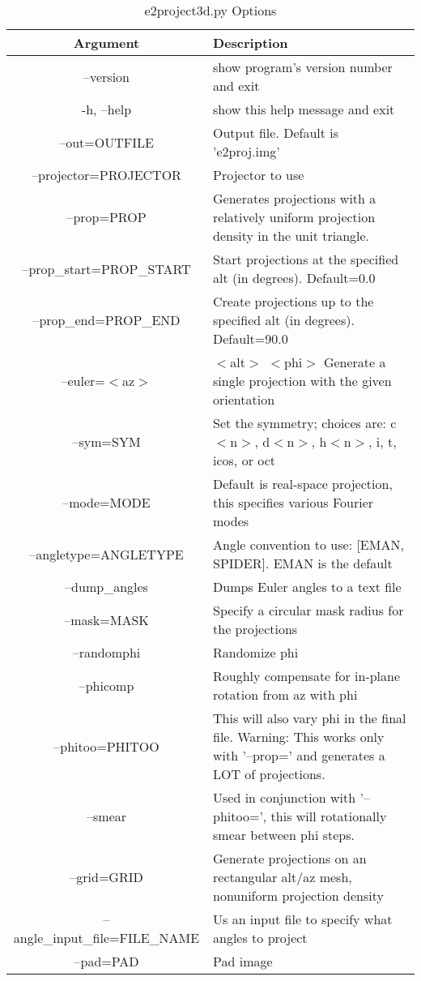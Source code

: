 \begin{longtable}{|c||p{3.5in}|}
\hline \bf{Argument} & \bf{Description}\endhead
\hline \multicolumn{2}{r}{{Continued on next page}} \endfoot
\hline \hline \caption[e2project3d.py Options]{e2project3d.py Options}\endlastfoot
\\\hline   --version  &  show program's version number and exit
\\\hline   -h, --help  &  show this help message and exit
\\\hline   --out=OUTFILE  &  Output file. Default is 'e2proj.img'
\\\hline   --projector=PROJECTOR  &  Projector to use
\\\hline   --prop=PROP  &  Generates projections with a relatively uniform projection density in the unit triangle.
\\\hline   --prop\_start=PROP\_START  &  Start projections at the specified alt (in degrees). Default=0.0
\\\hline   --prop\_end=PROP\_END  &  Create projections up to the specified alt (in degrees). Default=90.0
\\\hline   --euler=$<$az$>$  &  $<$alt$>$ $<$phi$>$ Generate a single projection with the given orientation
\\\hline   --sym=SYM  &  Set the symmetry; choices are: c$<$n$>$, d$<$n$>$, h$<$n$>$, i, t, icos, or oct
\\\hline   --mode=MODE  &  Default is real-space projection, this specifies various Fourier modes
\\\hline   --angletype=ANGLETYPE  &  Angle convention to use: [EMAN, SPIDER].  EMAN is the default
\\\hline   --dump\_angles  &  Dumps Euler angles to a text file
\\\hline   --mask=MASK  &  Specify a circular mask radius for the projections
\\\hline   --randomphi  &  Randomize phi
\\\hline   --phicomp  &  Roughly compensate for in-plane rotation from az with phi
\\\hline   --phitoo=PHITOO  &  This will also vary phi in the final file. Warning: This works only with '--prop=' and generates a LOT of projections.
\\\hline   --smear  &  Used in conjunction with '--phitoo=', this will rotationally smear between phi steps.
\\\hline   --grid=GRID  &  Generate projections on an rectangular alt/az mesh, nonuniform projection density
\\\hline   --angle\_input\_file=FILE\_NAME  &  Us an input file to specify what angles to project
\\\hline
 --pad=PAD  &  Pad image
\\\hline
\end{longtable}
